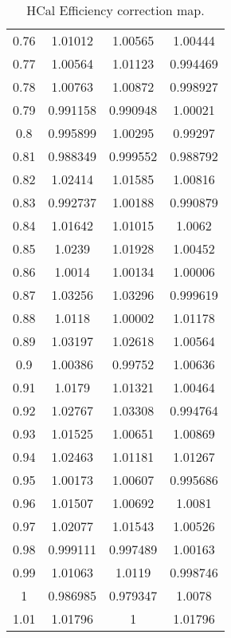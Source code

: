 \begin{table}[h!]
\begin{tabular}{|c|c|c|c|}
0.76 & 1.01012 & 1.00565 & 1.00444 \\
0.77 & 1.00564 & 1.01123 & 0.994469 \\
0.78 & 1.00763 & 1.00872 & 0.998927 \\
0.79 & 0.991158 & 0.990948 & 1.00021 \\
0.8 & 0.995899 & 1.00295 & 0.99297 \\
0.81 & 0.988349 & 0.999552 & 0.988792 \\
0.82 & 1.02414 & 1.01585 & 1.00816 \\
0.83 & 0.992737 & 1.00188 & 0.990879 \\
0.84 & 1.01642 & 1.01015 & 1.0062 \\
0.85 & 1.0239 & 1.01928 & 1.00452 \\
0.86 & 1.0014 & 1.00134 & 1.00006 \\
0.87 & 1.03256 & 1.03296 & 0.999619 \\
0.88 & 1.0118 & 1.00002 & 1.01178 \\
0.89 & 1.03197 & 1.02618 & 1.00564 \\
0.9 & 1.00386 & 0.99752 & 1.00636 \\
0.91 & 1.0179 & 1.01321 & 1.00464 \\
0.92 & 1.02767 & 1.03308 & 0.994764 \\
0.93 & 1.01525 & 1.00651 & 1.00869 \\
0.94 & 1.02463 & 1.01181 & 1.01267 \\
0.95 & 1.00173 & 1.00607 & 0.995686 \\
0.96 & 1.01507 & 1.00692 & 1.0081 \\
0.97 & 1.02077 & 1.01543 & 1.00526 \\
0.98 & 0.999111 & 0.997489 & 1.00163 \\
0.99 & 1.01063 & 1.0119 & 0.998746 \\
1 & 0.986985 & 0.979347 & 1.0078 \\
1.01 & 1.01796 & 1 & 1.01796 \\
\hline
\end{tabular}
\caption{HCal Efficiency correction map.}
\label{tab:hcal_efficiency_correction}
\end{table}
